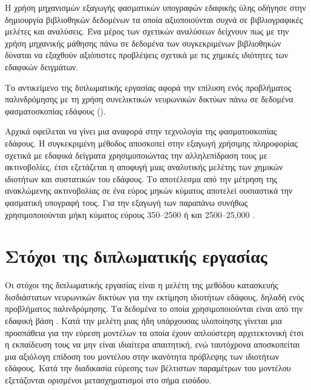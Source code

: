 Η χρήση μηχανισμών εξαγωγής φασματικών υπογραφών εδαφικής ύλης οδήγησε στην δημιουργία βιβλιοθηκών δεδομένων τα οποία αξιοποιούνται συχνά σε βιβλιογραφικές μελέτες και αναλύσεις. Ένα μέρος των σχετικών αναλύσεων δείχνουν πως με την χρήση μηχανικής μάθησης πάνω σε δεδομένα των συγκεκριμένων βιβλιοθηκών δύναται να εξαχθούν αξιόπιστες προβλέψεις σχετικά με τις χημικές ιδιότητες των εδαφικών δειγμάτων.

Το αντικείμενο της διπλωματικής εργασίας αφορά την επίλυση ενός προβλήματος παλινδρόμησης με τη χρήση συνελικτικών νευρωνικών δικτύων πάνω σε δεδομένα φασματοσκοπίας εδάφους ().

Αρχικά οφείλεται να γίνει μια αναφορά στην τεχνολογία της φασματοσκοπίας εδάφους. Η συγκεκριμένη μέθοδος αποσκοπεί στην εξαγωγή χρήσιμης πληροφορίας σχετικά με εδαφικά δείγματα χρησιμοποιώντας την αλληλεπίδραση τους με ακτινοβολίες, έτσι εξετάζεται η αποφυγή μιας αναλυτικής μελέτης των χημικών ιδιοτήτων και συστατικών του εδάφους. Το αποτέλεσμα από την μέτρηση της ανακλώμενης ακτινοβολίας σε ένα εύρος μηκών κύματος αποτελεί ουσιαστικά την φασματική υπογραφή τους. Για την εξαγωγή των παραπάνω συνήθως χρησιμοποιούνται μήκη κύματος εύρους 350–2500  ή και 2500–25,000 .

\section{Στόχοι της διπλωματικής εργασίας}
Οι στόχοι της διπλωματικής εργασίας είναι η μελέτη της μεθόδου κατασκευής δισδιάστατων νευρωνικών δικτύων για την εκτίμηση ιδιοτήτων εδάφους, δηλαδή ενός προβλήματος παλινδρόμησης. Τα δεδομένα το οποία χρησιμοποιούνται είναι από την εδαφική βάση  \cite{lucas_soil}. Κατά την μελέτη μιας ήδη υπάρχουσας υλοποίησης γίνεται μια προσπάθεια για την εύρεση μοντέλων τα οποία έχουν απλούστερη αρχιτεκτονική έτσι η εκπαίδευση τους να μην είναι ιδιαίτερα απαιτητική, ενώ ταυτόχρονα αποσκοπείται μια αξιόλογη επίδοση του μοντέλου στην ικανότητα πρόβλεψης των ιδιοτήτων εδάφους. Κατά την διαδικασία εύρεσης των βέλτιστων παραμέτρων του μοντέλου εξετάζονται ορισμένοι μετασχηματισμοί στο σήμα εισόδου.
